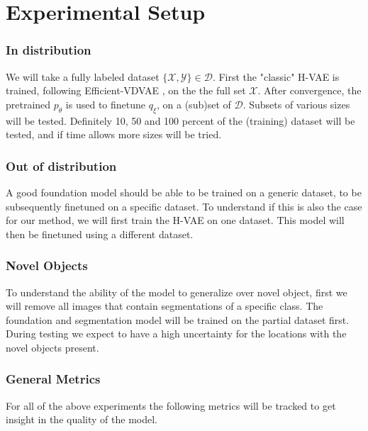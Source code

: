 \chapter{Experimental Setup}\label{chapter:second_real_chapter}

\subsection*{In distribution}
We will take a fully labeled dataset $\{\mathcal{X}, \mathcal{Y} \} \in \mathcal{D}$. First the "classic" H-VAE is trained, following Efficient-VDVAE \cite{hazami2022efficientvdvae}, on the the full set $\mathcal{X}$. After convergence, the pretrained $p_\theta$ is used to finetune $q_\xi$, on a (sub)set of $\mathcal{D}$.
Subsets of various sizes will be tested. Definitely  10, 50 and 100 percent of the (training) dataset will be tested, and if time allows more sizes will be tried.

\subsection*{Out of distribution}
A good foundation model should be able to be trained on a generic dataset, to be subsequently finetuned on a specific dataset. To understand if this is also the case for our method, we will first train the H-VAE on one dataset. This model will then be finetuned using a different dataset.

\subsection*{Novel Objects}
To understand the ability of the model to generalize over novel object, first we will remove all images that contain segmentations of a specific class. The foundation and segmentation model will be trained on the partial dataset first. During testing we expect to have a high uncertainty for the locations with the novel objects present.


\subsection*{General Metrics}
For all of the above experiments the following metrics will be tracked to get insight in the quality of the model.

